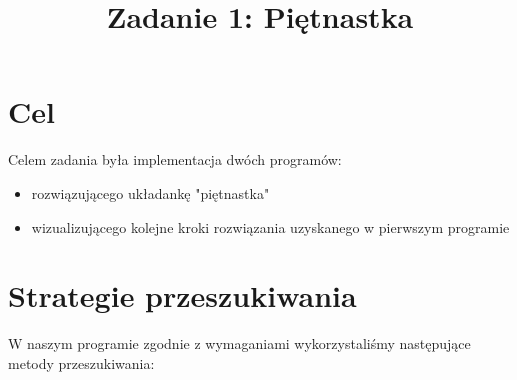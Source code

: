 \documentclass{classrep}
\author{
  \studentinfo{Tomasz Trębski}{158065} \and
  \studentinfo{Sebastian Jakowski}{165415} \and
  \studentinfo{Andrzej Prokopczyk}{165502}
}
\title{Zadanie 1: Piętnastka}
\begin{document}
	\maketitle
	\section{Cel}
		Celem zadania była implementacja dwóch programów:
		\begin{itemize}
		\item rozwiązującego układankę "piętnastka"
		\item wizualizującego kolejne kroki rozwiązania uzyskanego w pierwszym programie
		\end{itemize}
	
	\section{Strategie przeszukiwania}
		W naszym programie zgodnie z wymaganiami wykorzystaliśmy następujące metody przeszukiwania:
\end{document}
